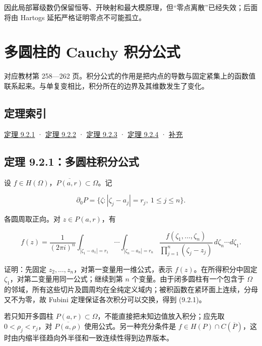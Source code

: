 \documentclass[11pt,a4paper]{article}
\begin{document}
因此局部幂级数仍保留恒等、开映射和最大模原理，但``零点离散''已经失效；后面将由
Hartogs 延拓严格证明零点不可能孤立。

\section{多圆柱的 Cauchy 积分公式}
\hypertarget{chapter9-part-2}{}
\par
对应教材第 258---262
页。积分公式的作用是把内点的导数与固定紧集上的函数值联系起来。与单复变相比，积分所在的边界及其维数发生了变化。

\subsection*{定理索引}\label{ch09-s2-heading-1}

\hyperref[ch09-s2-heading-2]{定理 9.2.1} · \hyperref[ch09-s2-heading-3]{定理 9.2.2} ·
\hyperref[ch09-s2-heading-4]{定理 9.2.3} · \hyperref[ch09-s2-heading-5]{定理 9.2.4} ·
\hyperref[ch09-s2-heading-6]{补充}

\subsection{定理 9.2.1：多圆柱积分公式}\label{ch09-s2-heading-2}

设 \(f\in H(\Omega)\)，\(\overline{P(a,r)}\subset\Omega\)。记

\[
\partial_0P=\{\zeta:|\zeta_j-a_j|=r_j,\ 1\le j\le n\}.
\]

各圆周取正向。对 \(z\in P(a,r)\)，有

\[
f(z)=\frac1{(2\pi i)^n}
\int_{|\zeta_1-a_1|=r_1}\!\cdots\!\int_{|\zeta_n-a_n|=r_n}
\frac{f(\zeta_1,\ldots,\zeta_n)}{\prod_{j=1}^n(\zeta_j-z_j)}
\,d\zeta_n\cdots d\zeta_1.
\tag{9.2.1}
\]

证明：先固定 \(z_2,\ldots,z_n\)，对第一变量用一维公式，表示
\(f(z)\)。在所得积分中固定 \(\zeta_1\)，对第二变量用同一公式；继续到第
\(n\) 个变量。由于闭多圆柱有一个包含于 \(\Omega\)
的邻域，所有这些切片及圆周均在全纯定义域内；被积函数在紧环面上连续，分母又不为零，故
Fubini 定理保证各次积分可以交换，得到 (9.2.1)。

若只知开多圆柱
\(P(a,r)\subset\Omega\)，不能直接把未知边值放入积分；应先取
\(0<\rho_j<r_j\)，对 \(\overline{P(a,\rho)}\) 使用公式。另一种充分条件是
\(f\in H(P)\cap C(\overline P)\)，这时由内缩半径趋向外半径和一致连续性得到边界版本。
\end{document}
